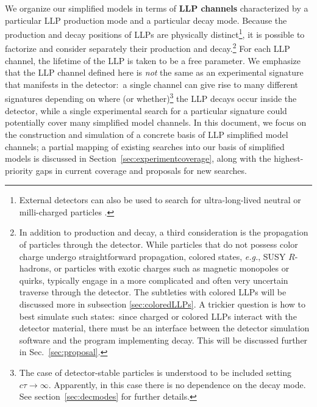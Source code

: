 We organize our simplified models in terms of {\bf LLP channels} characterized by a particular LLP production mode and a particular decay mode. Because the production and decay positions of LLPs are physically distinct\footnote{External detectors can also be used to search for ultra-long-lived neutral or milli-charged particles \cite{Haas:2014dda,Chou:2016lxi,Gligorov:2017nwh,Feng:2017uoz}. }, it is possible to factorize and consider separately their production and decay.\footnote{In addition to production and decay, a third consideration is the propagation of particles through the detector.  While particles that do not possess color charge undergo straightforward propagation, colored states, \emph{e.g.}, SUSY $R$-hadrons, or particles with exotic charges such as magnetic monopoles or quirks, typically engage in a more complicated and often very uncertain traverse through the detector.  The subtleties with colored LLPs will be discussed more in subsection \ref{sec:coloredLLPs}. A trickier question is how to best simulate such states:~since charged or colored LLPs interact with the detector material, there must be an interface between the detector simulation software and the program implementing decay. This will be discussed further in Sec.~\ref{sec:proposal}.} 
For each LLP channel, the lifetime of the LLP is taken to be a free parameter. We emphasize that the LLP channel defined here is \emph{not} the same as an experimental signature that manifests in the detector:~a single channel can give rise to many different signatures depending on where (or whether)\footnote{The case of detector-stable particles is understood to be included setting $c\tau\to\infty$. Apparently, in this case there is no dependence on the decay mode.
See section~\ref{sec:decmodes} for further details.} the LLP decays occur inside the detector, while a single experimental search for a particular signature could potentially cover many simplified model channels. In this document, we focus on the construction and simulation of a concrete basis of LLP simplified model channels; a partial mapping of existing searches into our basis of simplified models is discussed in Section~\ref{sec:experimentcoverage}, along with the highest-priority gaps in current coverage and proposals for new searches.


